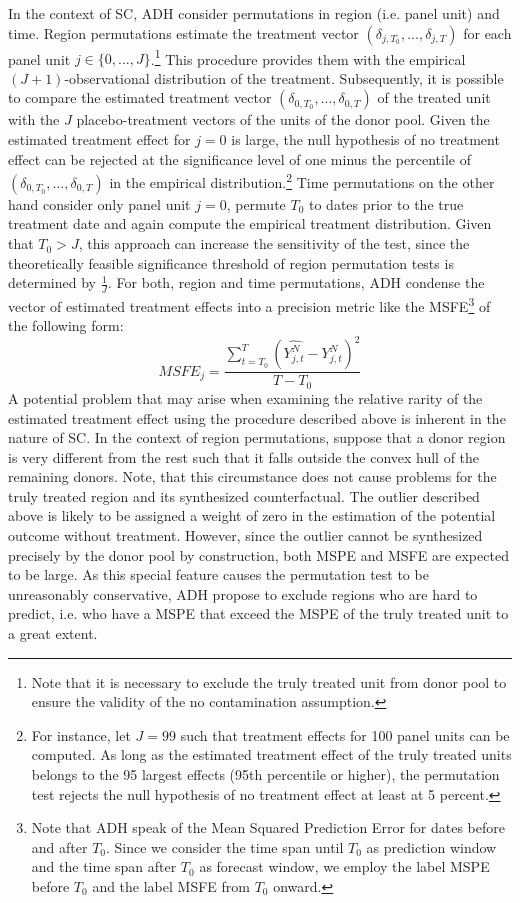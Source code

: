 In the context of \ac{SC}, \ac{ADH} consider permutations in region (i.e. panel unit) and time. Region permutations estimate the treatment vector $(\delta_{j,T_0}, ..., \delta_{j,T})$ for each panel unit $j \in \{0, ..., J \}$.\footnote{Note that it is necessary to exclude the truly treated unit from donor pool to ensure the validity of the no contamination assumption.} This procedure provides them with the empirical $(J+1)$-observational distribution of the treatment. Subsequently, it is possible to compare the estimated treatment vector $(\delta_{0,T_0}, ..., \delta_{0,T})$ of the treated unit with the $J$ placebo-treatment vectors of the units of the donor pool. Given the estimated treatment effect for $j=0$ is large, the null hypothesis of no treatment effect can be rejected at the significance level of one minus the percentile of $(\delta_{0,T_0}, ..., \delta_{0,T})$ in the empirical distribution.\footnote{For instance, let $J = 99$ such that treatment effects for 100 panel units can be computed. As long as the estimated treatment effect of the truly treated units belongs to the 95 largest effects (95th percentile or higher), the permutation test rejects the null hypothesis of no treatment effect at least at 5 percent.} Time permutations on the other hand consider only panel unit $j = 0$, permute $T_0$ to dates prior to the true treatment date and again compute the empirical treatment distribution. Given that $T_0 > J$, this approach can increase the sensitivity of the test, since the theoretically feasible significance threshold of region permutation tests is determined by $\frac{1}{J}$. For both, region and time permutations, \ac{ADH} condense the vector of estimated treatment effects into a precision metric like the \ac{MSFE}\footnote{Note that \ac{ADH} speak of the Mean Squared Prediction Error for dates before and after $T_0$. Since we consider the time span until $T_0$ as prediction window and the time span after $T_0$ as forecast window, we employ the label \ac{MSPE} before $T_0$ and the label \ac{MSFE} from $T_0$ onward.} of the following form:
\[
MSFE_j = \frac{\sum_{t = T_0}^{T} \left(\widehat{Y_{j,t}^N} - Y_{j,t}^N\right) ^2}{T- T_0}
\]
A potential problem that may arise when examining the relative rarity of the estimated treatment effect using the procedure described above is inherent in the nature of \ac{SC}. In the context of region permutations, suppose that a donor region is very different from the rest such that it falls outside the convex hull of the remaining donors. Note, that this circumstance does not cause problems for the truly treated region and its synthesized counterfactual. The outlier described above is likely to be assigned a weight of zero in the estimation of the potential outcome without treatment. However, since the outlier cannot be synthesized precisely by the donor pool by construction, both \ac{MSPE} and \ac{MSFE} are expected to be large. As this special feature causes the permutation test to be unreasonably conservative, \ac{ADH} propose to exclude regions who are hard to predict, i.e. who have a \ac{MSPE} that exceed the \ac{MSPE} of the truly treated unit to a great extent. 

